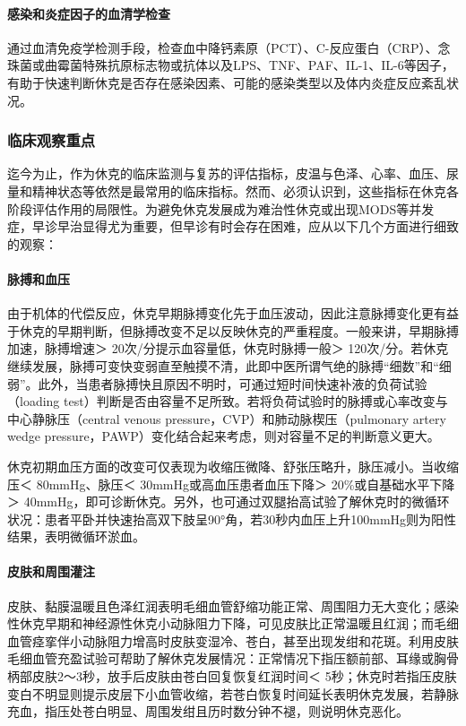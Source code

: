 \paragraph{感染和炎症因子的血清学检查}

通过血清免疫学检测手段，检查血中降钙素原（PCT）、C-反应蛋白（CRP）、念珠菌或曲霉菌特殊抗原标志物或抗体以及LPS、TNF、PAF、IL-1、IL-6等因子，有助于快速判断休克是否存在感染因素、可能的感染类型以及体内炎症反应紊乱状况。

\subsubsection{临床观察重点}

迄今为止，作为休克的临床监测与复苏的评估指标，皮温与色泽、心率、血压、尿量和精神状态等依然是最常用的临床指标。然而、必须认识到，这些指标在休克各阶段评估作用的局限性。为避免休克发展成为难治性休克或出现MODS等并发症，早诊早治显得尤为重要，但早诊有时会存在困难，应从以下几个方面进行细致的观察：

\paragraph{脉搏和血压}

由于机体的代偿反应，休克早期脉搏变化先于血压波动，因此注意脉搏变化更有益于休克的早期判断，但脉搏改变不足以反映休克的严重程度。一般来讲，早期脉搏加速，脉搏增速＞
20次/分提示血容量低，休克时脉搏一般＞
120次/分。若休克继续发展，脉搏可变快变弱直至触摸不清，此即中医所谓气绝的脉搏“细数”和“细弱”。此外，当患者脉搏快且原因不明时，可通过短时间快速补液的负荷试验（loading
test）判断是否由容量不足所致。若将负荷试验时的脉搏或心率改变与中心静脉压（central
venous pressure，CVP）和肺动脉楔压（pulmonary artery wedge
pressure，PAWP）变化结合起来考虑，则对容量不足的判断意义更大。

休克初期血压方面的改变可仅表现为收缩压微降、舒张压略升，脉压减小。当收缩压＜
80mmHg、脉压＜ 30mmHg或高血压患者血压下降＞ 20\%或自基础水平下降＞
40mmHg，即可诊断休克。另外，也可通过双腿抬高试验了解休克时的微循环状况：患者平卧并快速抬高双下肢呈90°角，若30秒内血压上升100mmHg则为阳性结果，表明微循环淤血。

\paragraph{皮肤和周围灌注}

皮肤、黏膜温暖且色泽红润表明毛细血管舒缩功能正常、周围阻力无大变化；感染性休克早期和神经源性休克小动脉阻力下降，可见皮肤比正常温暖且红润；而毛细血管痉挛伴小动脉阻力增高时皮肤变湿冷、苍白，甚至出现发绀和花斑。利用皮肤毛细血管充盈试验可帮助了解休克发展情况：正常情况下指压额前部、耳缘或胸骨柄部皮肤2～3秒，放手后皮肤由苍白回复恢复红润时间＜
5秒；休克时若指压皮肤变白不明显则提示皮层下小血管收缩，若苍白恢复时间延长表明休克发展，若静脉充血，指压处苍白明显、周围发绀且历时数分钟不褪，则说明休克恶化。

